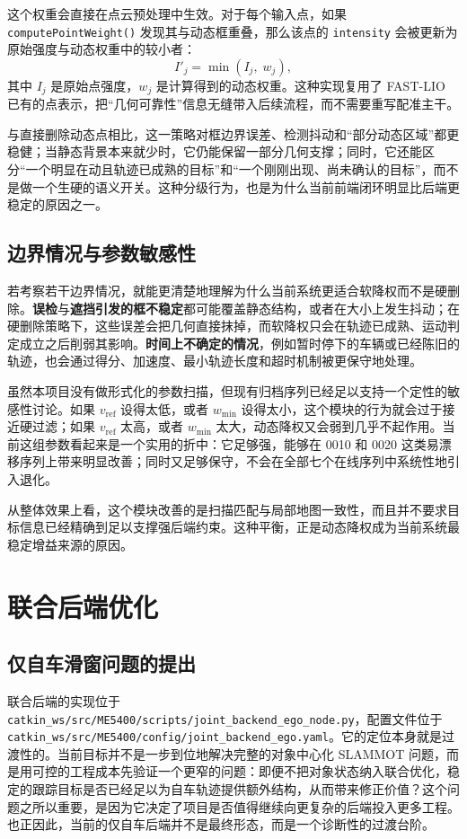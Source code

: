 \documentclass[utf8, a4paper, 12pt]{ctexart}
\begin{document}
这个权重会直接在点云预处理中生效。对于每个输入点，如果 \texttt{computePointWeight()} 发现其与动态框重叠，那么该点的 \texttt{intensity} 会被更新为原始强度与动态权重中的较小者：
\begin{equation}
I'_j = \min(I_j,\; w_j),
\end{equation}
其中 \(I_j\) 是原始点强度，\(w_j\) 是计算得到的动态权重。这种实现复用了 FAST-LIO 已有的点表示，把“几何可靠性”信息无缝带入后续流程，而不需要重写配准主干。

与直接删除动态点相比，这一策略对框边界误差、检测抖动和“部分动态区域”都更稳健；当静态背景本来就少时，它仍能保留一部分几何支撑；同时，它还能区分“一个明显在动且轨迹已成熟的目标”和“一个刚刚出现、尚未确认的目标”，而不是做一个生硬的语义开关。这种分级行为，也是为什么当前前端闭环明显比后端更稳定的原因之一。

\subsection{边界情况与参数敏感性}
若考察若干边界情况，就能更清楚地理解为什么当前系统更适合软降权而不是硬删除。\textbf{误检}与\textbf{遮挡引发的框不稳定}都可能覆盖静态结构，或者在大小上发生抖动；在硬删除策略下，这些误差会把几何直接抹掉，而软降权只会在轨迹已成熟、运动判定成立之后削弱其影响。\textbf{时间上不确定的情况}，例如暂时停下的车辆或已经陈旧的轨迹，也会通过得分、加速度、最小轨迹长度和超时机制被更保守地处理。

虽然本项目没有做形式化的参数扫描，但现有归档序列已经足以支持一个定性的敏感性讨论。如果 \(v_{\mathrm{ref}}\) 设得太低，或者 \(w_{\min}\) 设得太小，这个模块的行为就会过于接近硬过滤；如果 \(v_{\mathrm{ref}}\) 太高，或者 \(w_{\min}\) 太大，动态降权又会弱到几乎不起作用。当前这组参数看起来是一个实用的折中：它足够强，能够在 0010 和 0020 这类易漂移序列上带来明显改善；同时又足够保守，不会在全部七个在线序列中系统性地引入退化。

从整体效果上看，这个模块改善的是扫描匹配与局部地图一致性，而且并不要求目标信息已经精确到足以支撑强后端约束。这种平衡，正是动态降权成为当前系统最稳定增益来源的原因。

\section{联合后端优化}
\subsection{仅自车滑窗问题的提出}
联合后端的实现位于 \texttt{catkin\_ws/src/ME5400/scripts/joint\_backend\_ego\_node.py}，配置文件位于 \texttt{catkin\_ws/src/ME5400/config/joint\_backend\_ego.yaml}。它的定位本身就是过渡性的。当前目标并不是一步到位地解决完整的对象中心化 SLAMMOT 问题，而是用可控的工程成本先验证一个更窄的问题：即便不把对象状态纳入联合优化，稳定的跟踪目标是否已经足以为自车轨迹提供额外结构，从而带来修正价值？这个问题之所以重要，是因为它决定了项目是否值得继续向更复杂的后端投入更多工程。也正因此，当前的仅自车后端并不是最终形态，而是一个诊断性的过渡台阶。
\end{document}
